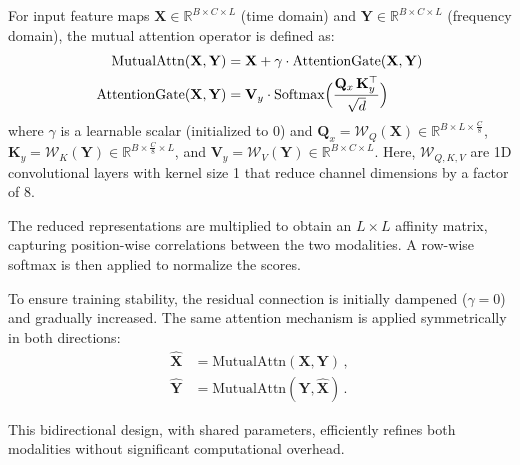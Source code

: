 \documentclass[conference]{IEEEtran}
\begin{document}
For input feature maps $\mathbf{X} \in \mathbb{R}^{B \times C \times L}$ (time domain) and $\mathbf{Y} \in \mathbb{R}^{B \times C \times L}$ (frequency domain), the mutual attention operator is defined as:
\begin{equation}
    \begin{aligned}
        \text{MutualAttn}(\mathbf{X}, \mathbf{Y})    & = \mathbf{X} + \gamma \cdot \text{AttentionGate}(\mathbf{X}, \mathbf{Y})                         \\
        \text{AttentionGate}(\mathbf{X}, \mathbf{Y}) & = \mathbf{V}_y \cdot \text{Softmax}\Bigl(\frac{\mathbf{Q}_x\, \mathbf{K}_y^\top}{\sqrt{d}}\Bigr)
    \end{aligned}
\end{equation}
where $\gamma$ is a learnable scalar (initialized to 0) and $\mathbf{Q}_x = \mathcal{W}_Q(\mathbf{X}) \in \mathbb{R}^{B \times L \times \frac{C}{8}}$, $\mathbf{K}_y = \mathcal{W}_K(\mathbf{Y}) \in \mathbb{R}^{B \times \frac{C}{8} \times L}$, and $\mathbf{V}_y = \mathcal{W}_V(\mathbf{Y}) \in \mathbb{R}^{B \times C \times L}$. Here, $\mathcal{W}_{Q,K,V}$ are 1D convolutional layers with kernel size 1 that reduce channel dimensions by a factor of 8.

The reduced representations are multiplied to obtain an $L \times L$ affinity matrix, capturing position-wise correlations between the two modalities. A row-wise softmax is then applied to normalize the scores.

To ensure training stability, the residual connection is initially dampened ($\gamma=0$) and gradually increased. The same attention mechanism is applied symmetrically in both directions:
\begin{equation}
    \begin{aligned}
        \widehat{\mathbf{X}} & = \text{MutualAttn}(\mathbf{X}, \mathbf{Y})\,,           \\
        \widehat{\mathbf{Y}} & = \text{MutualAttn}(\mathbf{Y}, \widehat{\mathbf{X}})\,.
    \end{aligned}
\end{equation}

This bidirectional design, with shared parameters, efficiently refines both modalities without significant computational overhead.
\end{document}
